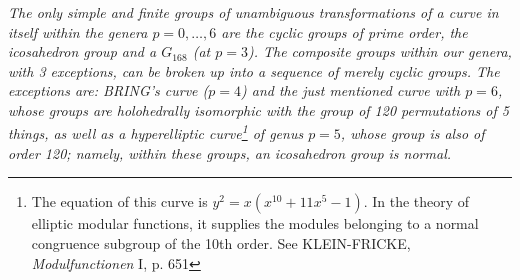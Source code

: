 \documentclass[leqno]{article}
\begin{document}
\textit{The only simple and finite groups of unambiguous transformations of a curve in itself within the genera $p=0, \dots, 6$ are the cyclic groups of prime order, the icosahedron group and a $G_{168}$ (at $p=3$). The composite groups within our genera, with 3 exceptions, can be broken up into a sequence of merely cyclic groups. The exceptions are: BRING's curve ($p=4$) and the just mentioned curve with $p=6$, whose groups are holohedrally isomorphic with the group of 120 permutations of 5 things, as well as a hyperelliptic curve\footnote{The equation of this curve is $y^2 = x(x^{10} + 11x^5-1)$. In the theory of elliptic modular functions, it supplies the modules belonging to a normal congruence subgroup of the 10th order. See KLEIN-FRICKE, \textit{Modulfunctionen} I, p. 651} of genus $p=5$, whose group is also of order 120; namely, within these groups, an icosahedron group is normal.}
\end{document}
